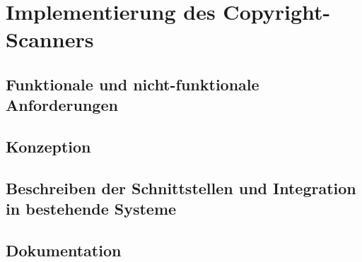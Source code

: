 \chapter{Implementierung des Copyright-Scanners}\label{ch:copyright-scanner}

\section{Funktionale und nicht-funktionale Anforderungen}

\section{Konzeption}

\section{Beschreiben der Schnittstellen und Integration in bestehende Systeme}

\section{Dokumentation}

